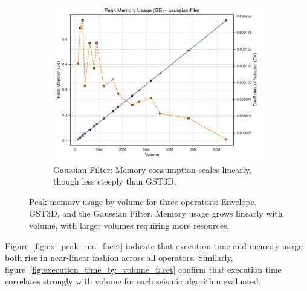 \begin{figure}[htbp]
\begin{subfigure}[t]{0.49\textwidth}
    \end{subfigure}
    \hfill
    \begin{subfigure}[t]{0.49\textwidth}
        \centering
        \includegraphics[width=\textwidth]{assets/images/05/peak_memory_by_volume_gaussian-filter}
        \caption{Gaussian Filter: Memory consumption scales linearly,
            though less steeply than \ac{GST3D}.}
    \end{subfigure}
    \caption{Peak memory usage by volume for three operators: Envelope, \ac{GST3D}, and the Gaussian Filter.
    Memory usage grows linearly with volume, with larger volumes requiring more resources.}
    \label{fig:peak_memory_facet}
\end{figure}

Figure~\ref{fig:ex_peak_mu_facet} indicate that execution time and memory usage both rise in near-linear fashion across all operators.
Similarly, figure~\ref{fig:execution_time_by_volume_facet} confirm that execution time correlates strongly with volume for each seismic algorithm evaluated.

